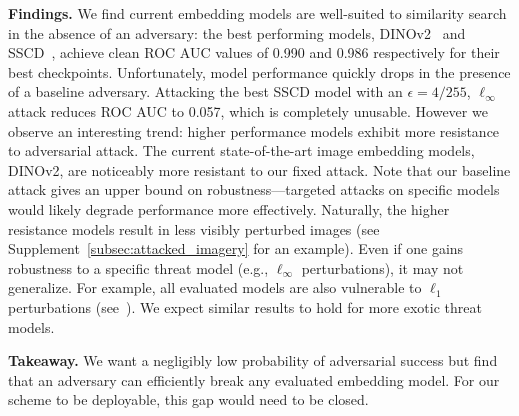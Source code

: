 \documentclass[12pt]{article}
\begin{document}
\textbf{Findings.} 
We find current embedding models are well-suited to similarity search in the absence of an adversary: the best performing models, DINOv2~\citep{oquab2023dinov2} and SSCD~\citep{pizzi2022self}, achieve clean ROC AUC values of 0.990 and 0.986 respectively for their best checkpoints.
Unfortunately, model performance quickly drops in the presence of a baseline adversary.
Attacking the best SSCD model with an $\epsilon = 4/255$, $\ell_\infty$ attack reduces ROC AUC to 0.057, which is completely unusable.
However we observe an interesting trend: higher performance models exhibit more resistance to adversarial attack.
The current state-of-the-art image embedding models, DINOv2, are noticeably more resistant to our fixed attack.
Note that our baseline attack gives an upper bound on robustness---targeted attacks on specific models would likely degrade performance more effectively.
Naturally, the higher resistance models result in less visibly perturbed images (see Supplement~\ref{subsec:attacked_imagery} for an example).
Even if one gains robustness to a specific threat model (e.g., $\ell_\infty$ perturbations), it may not generalize.
For example, all evaluated models are also vulnerable to $\ell_1$ perturbations (see~).
We expect similar results to hold for more exotic threat models.

\begin{tcolorbox}[colback=gray!10!white,leftrule=2.5mm,size=title]
\textbf{Takeaway.} 
We want a negligibly low probability of adversarial success but find that an adversary can efficiently break any evaluated embedding model.
For our scheme to be deployable, this gap would need to be closed.
\end{tcolorbox}
\end{document}
